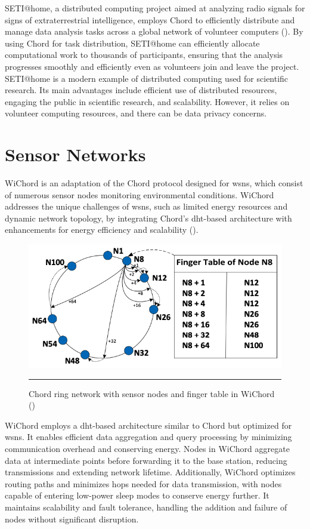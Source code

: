 SETI@home, a distributed computing project aimed at analyzing radio signals for signs of extraterrestrial intelligence, employs Chord to efficiently distribute and manage data analysis tasks across a global network of volunteer computers (\cite{anderson2002seti}).
By using Chord for task distribution, SETI@home can efficiently allocate computational work to thousands of participants, ensuring that the analysis progresses smoothly and efficiently even as volunteers join and leave the project.
SETI@home is a modern example of distributed computing used for scientific research.
Its main advantages include efficient use of distributed resources, engaging the public in scientific research, and scalability.
However, it relies on volunteer computing resources, and there can be data privacy concerns.

\section{Sensor Networks}
WiChord is an adaptation of the Chord protocol designed for \glspl{wsn}, which consist of numerous sensor nodes monitoring environmental conditions.
WiChord addresses the unique challenges of \glspl{wsn}, such as limited energy resources and dynamic network topology, by integrating Chord's \gls{dht}-based architecture with enhancements for energy efficiency and scalability (\cite{balatsouras2022wichord}).

\begin{figure}[htbp]
    \centering
 \includegraphics[width=.6\textwidth]{figures/chord-ring-network-sensor-nodes-finger-table.png}
     \rule{35em}{0.5pt}
    \caption{Chord ring network with sensor nodes and finger table in WiChord (\cite{balatsouras2022wichord})} 
\end{figure}


WiChord employs a \gls{dht}-based architecture similar to Chord but optimized for \glspl{wsn}.
It enables efficient data aggregation and query processing by minimizing communication overhead and conserving energy.
Nodes in WiChord aggregate data at intermediate points before forwarding it to the base station, reducing transmissions and extending network lifetime.
Additionally, WiChord optimizes routing paths and minimizes hops needed for data transmission, with nodes capable of entering low-power sleep modes to conserve energy further.
It maintains scalability and fault tolerance, handling the addition and failure of nodes without significant disruption.

